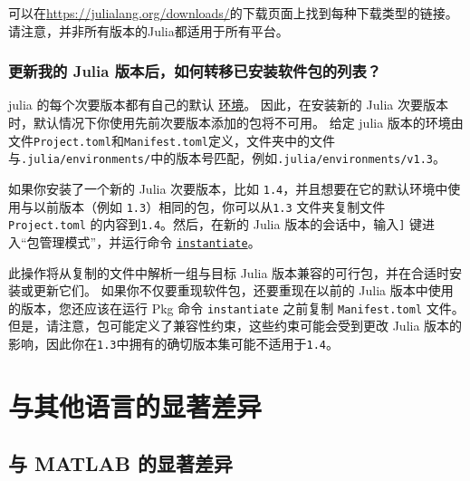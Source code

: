 可以在\href{https://julialang.org/downloads/}{https://julialang.org/downloads/}的下载页面上找到每种下载类型的链接。 请注意，并非所有版本的Julia都适用于所有平台。



\hypertarget{2370247892740743728}{}


\subsection{更新我的 Julia 版本后，如何转移已安装软件包的列表？}



julia 的每个次要版本都有自己的默认 \href{https://docs.julialang.org/en/v1/manual/code-loading/\#Environments-1}{环境}。 因此，在安装新的 Julia 次要版本时，默认情况下你使用先前次要版本添加的包将不可用。 给定 julia 版本的环境由文件\texttt{Project.toml}和\texttt{Manifest.toml}定义，文件夹中的文件与\texttt{.julia/environments/}中的版本号匹配，例如\texttt{.julia/environments/v1.3}。



如果你安装了一个新的 Julia 次要版本，比如 \texttt{1.4}，并且想要在它的默认环境中使用与以前版本（例如 \texttt{1.3}）相同的包，你可以从\texttt{1.3} 文件夹复制文件 \texttt{Project.toml} 的内容到\texttt{1.4}。然后，在新的 Julia 版本的会话中，输入\texttt{]} 键进入“包管理模式”，并运行命令 \href{https://julialang.github.io/Pkg.jl/v1/api/\#Pkg.instantiate}{\texttt{instantiate}}。



此操作将从复制的文件中解析一组与目标 Julia 版本兼容的可行包，并在合适时安装或更新它们。 如果你不仅要重现软件包，还要重现在以前的 Julia 版本中使用的版本，您还应该在运行 Pkg 命令 \texttt{instantiate} 之前复制 \texttt{Manifest.toml} 文件。 但是，请注意，包可能定义了兼容性约束，这些约束可能会受到更改 Julia 版本的影响，因此你在\texttt{1.3}中拥有的确切版本集可能不适用于\texttt{1.4}。



\hypertarget{8132004312407744699}{}


\chapter{与其他语言的显著差异}



\hypertarget{12239763473214700690}{}


\section{与 MATLAB 的显著差异}




